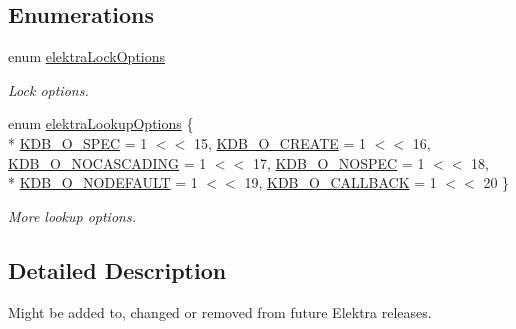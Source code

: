 \subsection*{Enumerations}
\begin{DoxyCompactItemize}
\item 
\hypertarget{group__proposal_ga824e384e248ed1e05448294bff7271c0}{enum \hyperlink{group__proposal_ga824e384e248ed1e05448294bff7271c0}{elektra\+Lock\+Options} }\label{group__proposal_ga824e384e248ed1e05448294bff7271c0}

\begin{DoxyCompactList}\small\item\em Lock options. \end{DoxyCompactList}\item 
enum \hyperlink{group__proposal_ga93673533c4c8eb1fdfca76b98c5f49b0}{elektra\+Lookup\+Options} \{ \\*
\hyperlink{group__proposal_gga93673533c4c8eb1fdfca76b98c5f49b0a187bc7e52493fb8f1eb5693015478dae}{K\+D\+B\+\_\+\+O\+\_\+\+S\+P\+E\+C} = 1 $<$$<$ 15, 
\hyperlink{group__proposal_gga93673533c4c8eb1fdfca76b98c5f49b0a72155bedec545b2e96372ab28169620a}{K\+D\+B\+\_\+\+O\+\_\+\+C\+R\+E\+A\+T\+E} = 1 $<$$<$ 16, 
\hyperlink{group__proposal_gga93673533c4c8eb1fdfca76b98c5f49b0abc4c6e04823b6d684f4db8df3b84f326}{K\+D\+B\+\_\+\+O\+\_\+\+N\+O\+C\+A\+S\+C\+A\+D\+I\+N\+G} = 1 $<$$<$ 17, 
\hyperlink{group__proposal_gga93673533c4c8eb1fdfca76b98c5f49b0a420d8ea3671ffea4fe8400570cfe5c8d}{K\+D\+B\+\_\+\+O\+\_\+\+N\+O\+S\+P\+E\+C} = 1 $<$$<$ 18, 
\\*
\hyperlink{group__proposal_gga93673533c4c8eb1fdfca76b98c5f49b0abdcfd6d28200b5c650615fba430496bb}{K\+D\+B\+\_\+\+O\+\_\+\+N\+O\+D\+E\+F\+A\+U\+L\+T} = 1 $<$$<$ 19, 
\hyperlink{group__proposal_gga93673533c4c8eb1fdfca76b98c5f49b0a70ac5d04d6f855e17e4c33dfeeddd39e}{K\+D\+B\+\_\+\+O\+\_\+\+C\+A\+L\+L\+B\+A\+C\+K} = 1 $<$$<$ 20
 \}
\begin{DoxyCompactList}\small\item\em More lookup options. \end{DoxyCompactList}\end{DoxyCompactItemize}


\subsection{Detailed Description}
Might be added to, changed or removed from future Elektra releases. 



